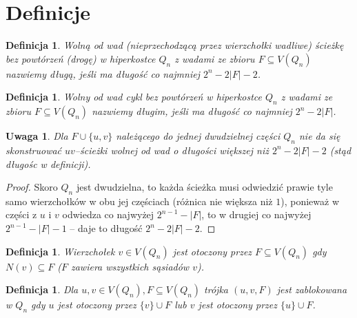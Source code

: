 \documentclass{pracamgr}
\newtheorem{defi}[theorem]{Definicja}
\newtheorem{remark}[theorem]{Uwaga}
\begin{document}
  \section{Definicje}
   \begin{defi}\label{dluga sciezka}
    Wolną od wad (nieprzechodzącą przez wierzchołki wadliwe)
    ścieżkę bez powtórzeń (drogę) w hiperkostce $Q_n$ z wadami ze zbioru $F\subseteq V(Q_n)$ nazwiemy długą, jeśli ma długość co najmniej $2^n-2|F|-2$.
   \end{defi}
   \begin{defi}\label{dlugi cykl}
    Wolny od wad cykl bez powtórzeń w hiperkostce $Q_n$ z wadami ze zbioru $F\subseteq V(Q_n)$ nazwiemy długim, jeśli ma długość co najmniej $2^n-2|F|$.
   \end{defi}
   \begin{remark}\label{dluga sciezka- nie da sie dluzszej}
    Dla $F\cup\{u,v\}$ należącego do jednej dwudzielnej części $Q_n$ nie da się skonstruować $uv$--ścieżki wolnej od wad o długości większej niż $2^n-2|F|-2$
    (stąd długośc w definicji).
   \end{remark}
   \begin{proof}
    Skoro $Q_n$ jest dwudzielna, to każda ścieżka musi odwiedzić prawie tyle samo wierzchołków w obu jej częściach (różnica nie większa niż $1$),
    ponieważ w części z $u$ i $v$ odwiedza co najwyżej $2^{n-1}-|F|$, to w drugiej co najwyżej $2^{n-1}-|F|-1$ -- daje to długość $2^n-2|F|-2$.
   \end{proof}
   \begin{defi}\label{wierzcholek otoczony}
    Wierzchołek $v\in V(Q_n)$ jest \emph{otoczony} przez $F\subseteq V(Q_n)$ gdy $N(v)\subseteq F$ ($F$ zawiera wszystkich sąsiadów $v$).
   \end{defi}
   \begin{defi}\label{para zablokowana}
    Dla $u,v\in V(Q_n), F\subseteq V(Q_n)$
    trójka $(u,v,F)$ jest \emph{zablokowana w $Q_n$} gdy $u$ jest otoczony przez $\{v\}\cup F$ lub $v$ jest otoczony przez $\{u\}\cup F$.
   \end{defi}
\end{document}
